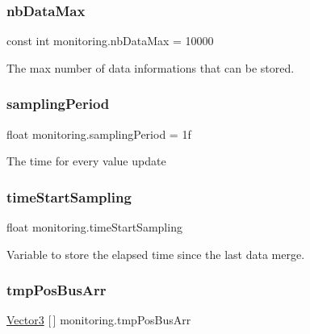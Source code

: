 \subsubsection{\texorpdfstring{nb\+Data\+Max}{nbDataMax}}
{\footnotesize\ttfamily const int monitoring.\+nb\+Data\+Max = 10000\hspace{0.3cm}{\ttfamily [private]}}



The max number of data informations that can be stored.

\mbox{\label{classmonitoring_a20213a8bca2c7713ea994a8f0625e810}} 
\subsubsection{\texorpdfstring{sampling\+Period}{samplingPeriod}}
{\footnotesize\ttfamily float monitoring.\+sampling\+Period = 1f}



The time for every value update

\mbox{\label{classmonitoring_a15b5bc6036048bde3e57edcbf53f6bc3}} 
\subsubsection{\texorpdfstring{time\+Start\+Sampling}{timeStartSampling}}
{\footnotesize\ttfamily float monitoring.\+time\+Start\+Sampling\hspace{0.3cm}{\ttfamily [private]}}



Variable to store the elapsed time since the last data merge.

\mbox{\label{classmonitoring_a37b82c6f5aad1407bf7d68fa141d5c2e}} 
\subsubsection{\texorpdfstring{tmp\+Pos\+Bus\+Arr}{tmpPosBusArr}}
{\footnotesize\ttfamily \hyperlink{classmonitoring_a4a225f8529921b2f6b38156cf3b296cf}{Vector3} \mbox{[}$\,$\mbox{]} monitoring.\+tmp\+Pos\+Bus\+Arr\hspace{0.3cm}{\ttfamily [private]}}




